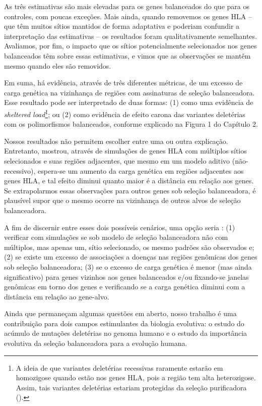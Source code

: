 \begin{refsection}
As três estimativas são mais elevadas para os genes balanceados do que para os controles, com poucas exceções. Mais ainda, quando removemos os genes HLA -- que têm muitos sítios mantidos de forma adaptativa e poderiam confundir a interpretação das estimativas -- os resultados foram qualitativamente semelhantes. Avaliamos, por fim, o impacto que os sítios potencialmente selecionados nos  genes balanceados têm sobre essas estimativas, e vimos que as observações se mantêm mesmo quando eles são removidos.

Em suma, há evidência, através de três diferentes métricas, de um excesso de carga genética na vizinhança de regiões com assinaturas de seleção balanceadora. Esse resultado pode ser interpretado de duas  formas: (1) como uma evidência de \emph{sheltered load}\footnote{A ideia de que variantes deletérias recessivas raramente estarão em homozigose quando estão nos genes HLA, pois a região tem alta heterozigose. Assim, tais variantes deletérias estariam protegidas da seleção purificadora (\cite{VanOosterhout2009}).}; ou (2) como evidência de efeito carona das variantes deletérias com os polimorfismos balanceados, conforme explicado na Figura 1 do Capítulo 2. 

Nossos resultados não permitem escolher entre uma ou outra explicação. Entretanto, \cite{Lenz2013} mostrou, através de simulações de genes HLA com múltiplos sítios selecionados e suas regiões adjacentes, que mesmo em um modelo aditivo (não-recessivo), espera-se um aumento da carga genética em regiões adjacentes aos genes HLA, e tal efeito diminui quanto maior é a distância em relação aos genes. Se extrapolarmos essas observações para outros genes sob seleção balanceadora, é plausível supor que o mesmo ocorre na vizinhança de outros alvos de seleção balanceadora.

A fim de discernir entre esses dois possíveis cenários, uma opção seria : (1) verificar com simulações se sob modelo de seleção balanceadora não com múltiplos, mas apenas um, sítio selecionado, os mesmo padrões são observados e; (2) se existe um excesso de associações a doenças nas regiões genômicas dos genes sob seleção balanceadora; (3) se o excesso de carga genética é menor (mas ainda significativo) para genes vizinhos aos genes balanceados e/ou fixando-se janelas genômicas em torno dos genes e verificando se a carga genética diminui com a distância em relação ao gene-alvo.

Ainda que permaneçam algumas questões em aberto, nosso trabalho é uma  contribuição para dois campos estimulantes da biologia evolutiva: o estudo do acúmulo de mutações deletérias no genoma humano e o estudo da importância evolutiva da seleção balanceadora para a evolução humana. 
%
%
%
\newpage

\end{refsection}
